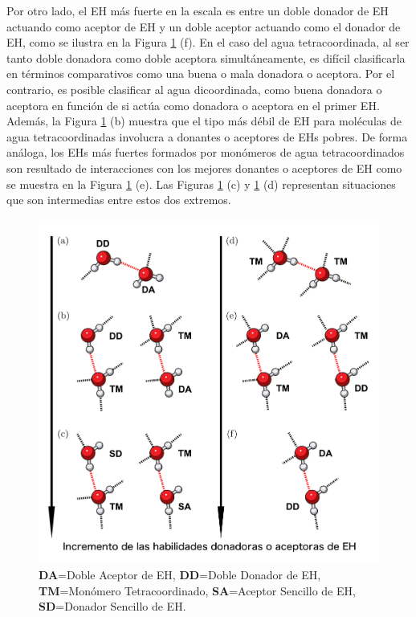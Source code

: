 Por otro lado, el EH más fuerte en la escala es entre un doble donador de EH
actuando como aceptor de EH y un doble aceptor actuando como el donador de EH,
como se ilustra en la Figura \ref{img6} (f). En el caso del agua
tetracoordinada, al ser tanto doble donadora como doble aceptora
simultáneamente, es difícil clasificarla en términos comparativos como una
buena o mala donadora o aceptora. Por el contrario, es posible clasificar al
agua dicoordinada, como buena donadora o aceptora en función de si actúa como
donadora o aceptora en el primer EH.  Además, la Figura \ref{img6} (b) muestra
que el tipo más débil de EH para moléculas de agua tetracoordinadas involucra a
donantes o aceptores de EHs pobres.  De forma análoga, los EHs más fuertes
formados por monómeros de agua tetracoordinados son resultado de interacciones
con los mejores donantes o aceptores de EH como se muestra en la Figura
\ref{img6} (e). Las Figuras \ref{img6} (c) y \ref{img6} (d) representan
situaciones que son intermedias entre estos dos extremos.

\begin{figure}%
    \centering
    \includegraphics[width=1.00\textwidth]{4/img/figure6}
    \caption{\textbf{DA}=Doble Aceptor de EH, \textbf{DD}=Doble Donador de EH, \textbf{TM}=Monómero Tetracoordinado, \textbf{SA}=Aceptor Sencillo de EH, \textbf{SD}=Donador Sencillo de EH.}
\label{img6}
\end{figure}

